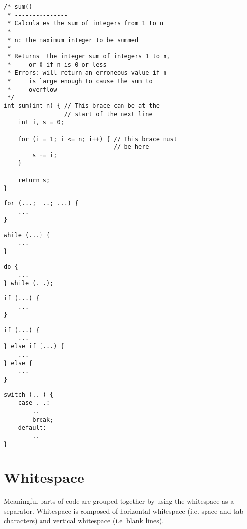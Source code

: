 \documentclass{article}
\begin{document}
\begin{multicols}{2}
\begin{lstlisting}
/* sum()
 * ---------------
 * Calculates the sum of integers from 1 to n.
 *
 * n: the maximum integer to be summed
 *
 * Returns: the integer sum of integers 1 to n,
 *     or 0 if n is 0 or less
 * Errors: will return an erroneous value if n 
 *     is large enough to cause the sum to
 *     overflow
 */
int sum(int n) { // This brace can be at the
                 // start of the next line
    int i, s = 0;

    for (i = 1; i <= n; i++) { // This brace must 
                               // be here
        s += i;
    }

    return s;
}
\end{lstlisting}


\begin{lstlisting}
for (...; ...; ...) {
    ...
}
\end{lstlisting}

\begin{lstlisting}
while (...) {
    ...
}
\end{lstlisting}
\vfill
\columnbreak
{}
\begin{lstlisting}
do {
    ...
} while (...);
\end{lstlisting}

\begin{lstlisting}
if (...) {
    ...
}
\end{lstlisting}


\begin{lstlisting}
if (...) {
    ...
} else if (...) {
    ...
} else {
    ...
}
\end{lstlisting}

\begin{lstlisting}
switch (...) {
    case ...:
        ...
        break;
    default:
        ...
}
\end{lstlisting}
\end{multicols}

\section{Whitespace}
Meaningful parts of code are grouped together by using the whitespace as a separator.
Whitespace is composed of horizontal whitespace (i.e. space and tab characters) and vertical whitespace (i.e. blank lines).
\end{document}
